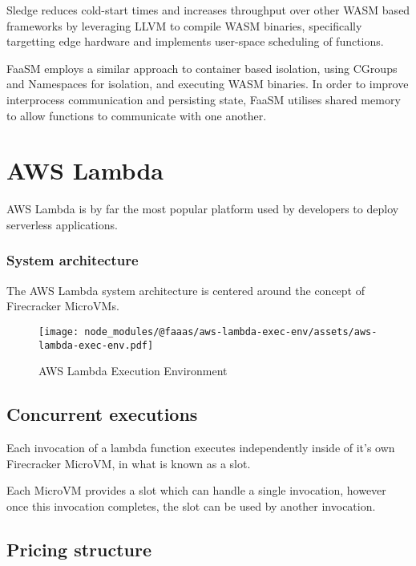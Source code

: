 Sledge reduces cold-start times and increases throughput over other WASM based \faas{} frameworks by leveraging LLVM to compile WASM binaries, specifically targetting edge hardware and implements user-space scheduling of functions\cite{gadepalliSledgeServerlessfirstLightweight2020}.

FaaSM employs a similar approach to container based isolation, using CGroups and Namespaces for isolation, and executing WASM binaries. In order to improve interprocess communication and persisting state, FaaSM utilises shared memory to allow functions to communicate with one another\cite{shillakerFaasmLightweightIsolation2020}.

\section{AWS Lambda}

AWS Lambda is by far the most popular\cite{eismannReviewServerlessUse2020,StateServerlessDatadog} \faas{} platform used by developers to deploy serverless applications.

\subsubsection{System architecture}

The AWS Lambda system architecture is centered around the concept of Firecracker MicroVMs\cite{agacheFirecrackerLightweightVirtualization2020}.

\begin{figure*}[t]
    \texttt{[image: node\_modules/@faaas/aws-lambda-exec-env/assets/aws-lambda-exec-env.pdf]}
    \caption{AWS Lambda Execution Environment}
    \label{fig:aws-lambda-exec-env}
\end{figure*}

\subsection{Concurrent executions}

Each invocation of a lambda function executes independently inside of it's own Firecracker MicroVM, in what is known as a slot.

Each MicroVM provides a slot which can handle a single invocation, however once this invocation completes, the slot can be used by another invocation.

\subsection{Pricing structure}

